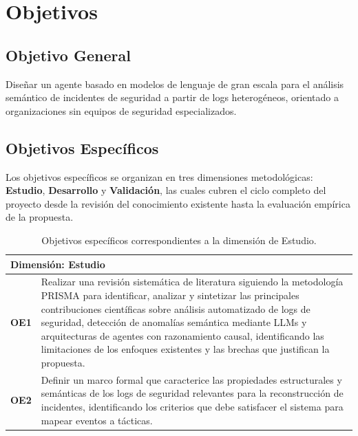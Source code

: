 \chapter{Objetivos}

\section{Objetivo General}

Diseñar un agente basado en modelos de lenguaje de gran escala
para el análisis semántico de incidentes de seguridad a partir
de logs heterogéneos, orientado a organizaciones sin equipos
de seguridad especializados.

\section{Objetivos Específicos}

Los objetivos específicos se organizan en tres dimensiones metodológicas: 
\textbf{Estudio}, \textbf{Desarrollo} y \textbf{Validación}, las cuales 
cubren el ciclo completo del proyecto desde la revisión del conocimiento 
existente hasta la evaluación empírica de la propuesta.

\begin{table}[H]
\centering
\renewcommand{\arraystretch}{1.6}
\begin{tabularx}{\textwidth}{| l | X |}
  \hline
  \multicolumn{2}{|l|}{\textbf{Dimensión: Estudio}} \\
  \hline
  \textbf{OE1} &
  Realizar una revisión sistemática de literatura siguiendo la metodología PRISMA para identificar, analizar y sintetizar las principales contribuciones científicas sobre análisis automatizado de logs de seguridad, detección de anomalías semántica mediante LLMs y arquitecturas de agentes con razonamiento causal, identificando las limitaciones de los enfoques existentes y las brechas que justifican la propuesta. \\
  \hline
  \textbf{OE2} &
  Definir un marco formal que caracterice las propiedades estructurales y semánticas de los logs de seguridad relevantes para la reconstrucción de incidentes, identificando los criterios que debe satisfacer el sistema para mapear eventos a tácticas.
  \\
  \hline
  
\end{tabularx}
\caption{Objetivos específicos correspondientes a la dimensión de Estudio.}
\label{tab:obj_estudio}
\end{table}

